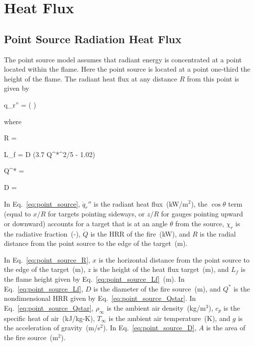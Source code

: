 \chapter{Heat Flux}

\section{Point Source Radiation Heat Flux}

The point source model assumes that radiant energy is concentrated at a point located within the flame. Here the point source is located at a point one-third the height of the flame. The radiant heat flux at any distance $R$ from this point is given by

\be
\dot q_r'' = \cos\theta \left(  \right)
\label{eq:point_source}
\ee

\noindent where

\be
R = 
\label{eq:point_source_R}
\ee

\be
L_f = D (3.7 Q^{*^{2/5}} - 1.02)
\label{eq:point_source_Lf}
\ee

\be
Q^* = 
\label{eq:point_source_Qstar}
\ee

\be
D = 
\label{eq:point_source_D}
\ee

In Eq.~\ref{eq:point_source}, $\dot q_r''$ is the radiant heat flux~(kW/m$^2$), the $\cos\theta$ term (equal to $x/R$ for targets pointing sideways, or $z/R$ for gauges pointing upward or downward) accounts for a target that is at an angle $\theta$ from the source, $\chi_r$ is the radiative fraction~(-), $\dot Q$ is the HRR of the fire~(kW), and $R$ is the radial distance from the point source to the edge of the target~(m).

In Eq.~\ref{eq:point_source_R}, $x$ is the horizontal distance from the point source to the edge of the target~(m), $z$ is the height of the heat flux target~(m), and $L_f$ is the flame height given by Eq.~\ref{eq:point_source_Lf}~(m).
In Eq.~\ref{eq:point_source_Lf}, $D$ is the diameter of the fire source~(m), and $Q^*$ is the nondimensional HRR given by Eq.~\ref{eq:point_source_Qstar}. In Eq.~\ref{eq:point_source_Qstar}, $\rho_\infty$ is the ambient air density~(kg/m$^3$), $c_p$ is the specific heat of air~(kJ/kg-K), $T_\infty$ is the ambient air temperature~(K), and $g$ is the acceleration of gravity~(m/s$^2$). In Eq.~\ref{eq:point_source_D}, $A$ is the area of the fire source~(m$^2$).


